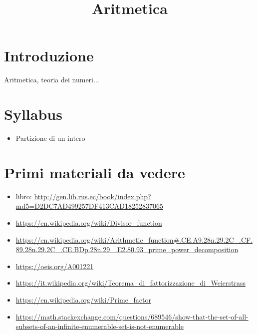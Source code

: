 \documentclass[a4paper,10pt]{article}
\title{Aritmetica}
\begin{document}
\maketitle


\section{Introduzione}
Aritmetica, teoria dei numeri...
\section{Syllabus}
\begin{itemize}
 \item Partizione di un intero
\end{itemize}

\section{Primi materiali da vedere}
\begin{itemize}
 \item libro: \url{http://gen.lib.rus.ec/book/index.php?md5=D2DC7AD499257DF413CAD18252837065}
 \item \url{https://en.wikipedia.org/wiki/Divisor_function}
 \item \url{https://en.wikipedia.org/wiki/Arithmetic_function#.CE.A9.28n.29.2C_.CF.89.28n.29.2C_.CE.BDp.28n.29_.E2.80.93_prime_power_decomposition}
 \item \url{https://oeis.org/A001221}
 \item \url{https://it.wikipedia.org/wiki/Teorema_di_fattorizzazione_di_Weierstrass}
 \item \url{https://en.wikipedia.org/wiki/Prime_factor}
 \item \url{https://math.stackexchange.com/questions/689546/show-that-the-set-of-all-subsets-of-an-infinite-enumerable-set-is-not-enumerable}
\end{itemize}
\end{document}
